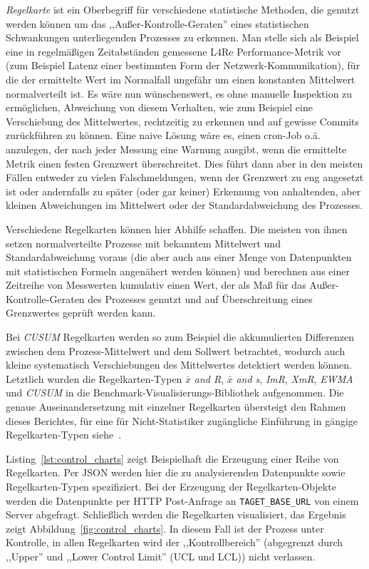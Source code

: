 \textit{Regelkarte} ist ein Oberbegriff für verschiedene statistische Methoden,
die genutzt werden können um das ,,Außer-Kontrolle-Geraten'' eines
statistischen Schwankungen unterliegenden Prozesses zu erkennen. Man stelle
sich als Beispiel eine in regelmäßigen Zeitabständen gemessene L4Re
Performance-Metrik vor (zum Beispiel Latenz einer bestimmten Form der
Netzwerk-Kommunikation), für die der ermittelte Wert im Normalfall ungefähr um
einen konstanten Mittelwert normalverteilt ist. Es wäre nun wünschenswert, es
ohne manuelle Inspektion zu ermöglichen, Abweichung von diesem Verhalten, wie
zum Beispiel eine Verschiebung des Mittelwertes, rechtzeitig zu erkennen und
auf gewisse Commits zurückführen zu können. Eine naive Lösung wäre es, einen
cron-Job o.ä. anzulegen, der nach jeder Messung eine Warnung ausgibt, wenn die
ermittelte Metrik einen festen Grenzwert überschreitet. Dies führt dann aber in
den meisten Fällen entweder zu vielen Falschmeldungen, wenn der Grenzwert zu
eng angesetzt ist oder andernfalls zu später (oder gar keiner) Erkennung von
anhaltenden, aber kleinen Abweichungen im Mittelwert oder der
Standardabweichung des Prozesses.

Verschiedene Regelkarten können hier Abhilfe schaffen. Die meisten von ihnen
setzen normalverteilte Prozesse mit bekanntem Mittelwert und Standardabweichung
voraus (die aber auch aus einer Menge von Datenpunkten mit statistischen
Formeln angenähert werden können) und berechnen aus einer Zeitreihe von
Messwerten kumulativ einen Wert, der als Maß für das Außer-Kontrolle-Geraten
des Prozesses genutzt und auf Überschreitung eines Grenzwertes geprüft werden
kann.

Bei \textit{CUSUM} Regelkarten werden so zum Beispiel die akkumulierten Differenzen
zwischen dem Prozess-Mittelwert und dem Sollwert betrachtet, wodurch auch
kleine systematisch Verschiebungen des Mittelwertes detektiert werden können.
Letztlich wurden die Regelkarten-Typen $\bar{x}$ \textit{and R}, $\bar{x}$
\textit{and s}, \textit{ImR}, \textit{XmR}, \textit{EWMA} und \textit{CUSUM} in
die Benchmark-Visualisierungs-Bibliothek aufgenommen. Die genaue
Auseinandersetzung mit einzelner Regelkarten übersteigt den Rahmen dieses
Berichtes, für eine für Nicht-Statistiker zugängliche Einführung in gängige
Regelkarten-Typen siehe~\cite{nist}.

Listing~\ref{lst:control_charts} zeigt Beispielhaft die Erzeugung einer Reihe von
Regelkarten. Per JSON werden hier die zu analysierenden Datenpunkte sowie
Regelkarten-Typen spezifiziert. Bei der Erzeugung der Regelkarten-Objekte werden
die Datenpunkte per HTTP Post-Anfrage an \texttt{TAGET\_BASE\_URL} von einem
Server abgefragt. Schließlich werden die Regelkarten visualisiert, das Ergebnis
zeigt Abbildung~\ref{fig:control_charts}. In diesem Fall ist der Prozess unter
Kontrolle, in allen Regelkarten wird der ,,Kontrollbereich'' (abgegrenzt durch
,,Upper'' und ,,Lower Control Limit'' (UCL und LCL)) nicht verlassen.

